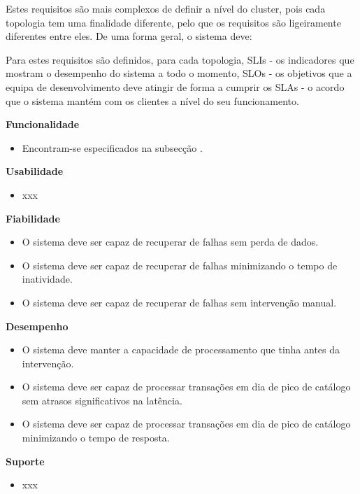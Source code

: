 Estes requisitos são mais complexos de definir a nível do \gls{cluster}, pois cada topologia tem 
uma finalidade diferente, pelo que os requisitos são ligeiramente diferentes entre eles. De uma
forma geral, o sistema deve:

Para estes requisitos são definidos, para cada topologia, \acp{SLI} - os indicadores que mostram o
desempenho do sistema a todo o momento, \acp{SLO} - os objetivos que a equipa de desenvolvimento
deve atingir de forma a cumprir os \acp{SLA} - o acordo que o sistema mantém com os clientes a 
nível do seu funcionamento.

\vspace{5mm}

\textbf{Funcionalidade}
\begin{itemize}
  \item Encontram-se especificados na subsecção .
\end{itemize}

\textbf{Usabilidade}
\begin{itemize}
  \item xxx
\end{itemize}

\textbf{Fiabilidade}

\begin{itemize}
  \item O sistema deve ser capaz de recuperar de falhas sem perda de dados.
  \item O sistema deve ser capaz de recuperar de falhas minimizando o tempo de inatividade.
  \item O sistema deve ser capaz de recuperar de falhas sem intervenção manual.
\end{itemize}

\textbf{Desempenho}
\begin{itemize}
  \item O sistema deve manter a capacidade de processamento que tinha antes da intervenção.
  \item O sistema deve ser capaz de processar transações em dia de pico de catálogo sem atrasos 
    significativos na latência.
  \item O sistema deve ser capaz de processar transações em dia de pico de catálogo minimizando o 
    tempo de resposta.
\end{itemize}

\textbf{Suporte}
\begin{itemize}
  \item xxx
\end{itemize}

